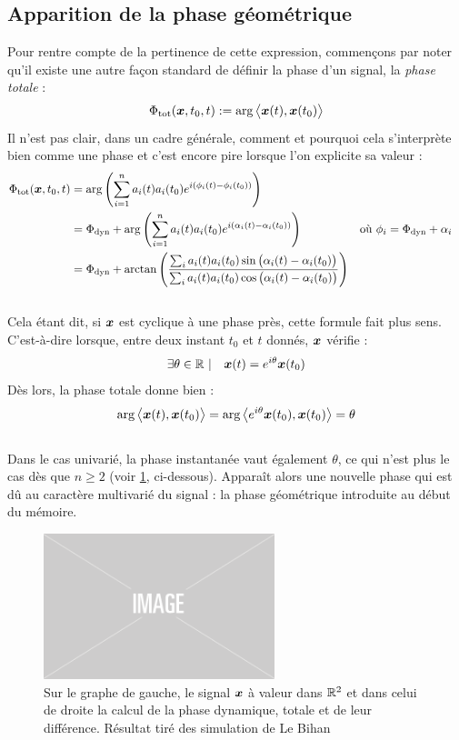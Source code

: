 \subsection{Apparition de la phase géométrique}\label{subsub:intro_phaseg}

Pour rentre compte de la pertinence de cette expression, commençons par noter qu'il existe une autre façon standard de définir la phase d'un signal, la \emph{phase totale} :
\begin{equation}\label{eq:phase_t}
	\phaset(\bf{x}, t_0, t) \defeq \arg\big\langle \bf{x}(t), \bf{x}(t_0)\big\rangle
\end{equation}
Il n'est pas clair, dans un cadre générale, comment et pourquoi cela s'interprète bien comme une phase et c'est encore pire lorsque l'on explicite sa valeur :
\begin{align*}
	\phaset(\bf{x},t_0, t) &= \arg \left( \sum_{i=1}^n a_i(t)a_i(t_0)e^{i(\phi_i(t)-\phi_i(t_0))} \right) \\
		&= \phased + \arg \left( \sum_{i=1}^n a_i(t)a_i(t_0)e^{i(\alpha_i(t)-\alpha_i(t_0))} \right)  &  &\text{où } \phi_i = \phased + \alpha_i  \\
		&= \phased + \arctan \left( \frac{\sum_i a_i(t)a_i(t_0)\sin\big( \alpha_i(t)-\alpha_i(t_0)\big)}{\sum_i a_i(t)a_i(t_0)\cos\big( \alpha_i(t)-\alpha_i(t_0)\big)}  \right)
\end{align*}
\\

Cela étant dit, si $\bf{x}$ est cyclique à une phase près, cette formule fait plus sens. C'est-à-dire lorsque, entre deux instant $t_0$ et $t$ donnés, $\bf{x}$ vérifie :
\[\exists \theta\in\R\ |\quad \bf{x}(t) = e^{i\theta} \bf{x}(t_0)\]
Dès lors, la phase totale donne bien :
\[\arg\big\langle \bf{x}(t), \bf{x}(t_0)\big\rangle = \arg\big\langle e^{i\theta} \bf{x}(t_0), \bf{x}(t_0)\big\rangle = \theta\]
\\
Dans le cas univarié, la phase instantanée vaut également $\theta$, ce qui n'est plus le cas dès que $n\geq 2$ (voir \cref{fig:calc_diff_phases}, ci-dessous). Apparaît alors une nouvelle phase qui est dû au caractère multivarié du signal : la phase géométrique introduite au début du mémoire.
\\
\begin{figure}[h]
	\includegraphics[width=0.6\textwidth]{fig/placeholder}
	\caption{Sur le graphe de gauche, le signal $\bf{x}$ à valeur dans $\R^2$ et dans celui de droite la calcul de la phase dynamique, totale et de leur différence. Résultat tiré des simulation de Le Bihan \etal \cite{le_bihan_modephysiques_2023}}
	\label{fig:calc_diff_phases}
\end{figure}

